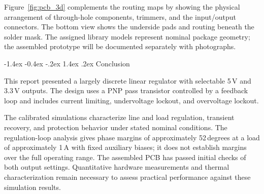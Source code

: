 \documentclass[conference]{IEEEtran}
\makeatletter
\renewcommand\section{\@startsection{section}{1}{\z@}%
  {-1.4ex \@plus -0.4ex \@minus -.2ex}%
  {1.4ex \@plus .2ex}%
  {\normalfont\sffamily\large\bfseries\centering}}
\makeatother
\begin{document}
Figure~\ref{fig:pcb_3d} complements the routing maps by showing the
physical arrangement of through-hole components, trimmers, and the
input/output connectors. The bottom view shows the underside pads and
routing beneath the solder mask. The assigned library models represent nominal
package geometry; the assembled prototype will be documented separately
with photographs.

\clearpage
\twocolumn

\section{Conclusion}

This report presented a largely discrete linear regulator with selectable 5\,V and 3.3\,V outputs. The design uses a PNP pass transistor controlled by a feedback loop and includes current limiting, undervoltage lockout, and overvoltage lockout.

The calibrated simulations characterize line and load regulation, transient recovery, and protection behavior under stated nominal conditions. The regulation-loop analysis gives phase margins of approximately 52\,degrees at a load of approximately 1\,A with fixed auxiliary biases; it does not establish margins over the full operating range. The assembled PCB has passed initial checks of both output settings. Quantitative hardware measurements and thermal characterization remain necessary to assess practical performance against these simulation results.

\printbibliography
\end{document}

